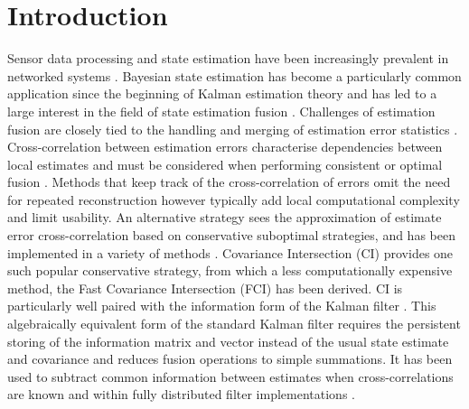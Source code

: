 \documentclass[letterpaper, 10 pt, conference]{ieeeconf}  %
\begin{document}
\section{Introduction}
Sensor data processing and state estimation have been increasingly prevalent in networked systems \cite{hallDistributedDataFusion2012,chongFortyYearsDistributed2017}. Bayesian state estimation has become a particularly common application since the beginning of Kalman estimation theory \cite{kalmanNewApproachLinear1960} and has led to a large interest in the field of state estimation fusion \cite{willnerKalmanFilterAlgorithms1977,chongHIERARCHICALESTIMATION,chongDistributedTrackingDistributed1986,hashemipourDecentralizedStructuresParallel1988,grimeDataFusionDecentralized1994}. Challenges of estimation fusion are closely tied to the handling and merging of estimation error statistics \cite{fouratiMultisensorDataFusion2017}. Cross-correlation between estimation errors characterise dependencies between local estimates and must be considered when performing consistent or optimal fusion \cite{bar-shalomTracktotrackCorrelationProblem1981,sunMultisensorOptimalInformation2004}. Methods that keep track of the cross-correlation of errors omit the need for repeated reconstruction \cite{steinbringOptimalSamplebasedFusion2016} however typically add local computational complexity and limit usability. An alternative strategy sees the approximation of estimate error cross-correlation based on conservative suboptimal strategies, and has been implemented in a variety of methods \cite{carlsonFederatedFilterFaulttolerant1988,julierNondivergentEstimationAlgorithm,sijsStateFusionUnknown2010,noackInverseCovarianceIntersection2017,niehsenInformationFusionBased2002,frankenImprovedFastCovariance2005}. Covariance Intersection (CI) \cite{julierNondivergentEstimationAlgorithm} provides one such popular conservative strategy, from which a less computationally expensive method, the Fast Covariance Intersection (FCI) \cite{niehsenInformationFusionBased2002} has been derived. CI is particularly well paired with the information form of the Kalman filter \cite{mutambaraDecentralizedEstimationControl2019}. This algebraically equivalent form of the standard Kalman filter requires the persistent storing of the information matrix and vector instead of the usual state estimate and covariance and reduces fusion operations to simple summations. It has been used to subtract common information between estimates when cross-correlations are known \cite{grimeDataFusionDecentralized1994} and within fully distributed filter implementations \cite{pfaffInformationFormDistributed2017}.
\end{document}
